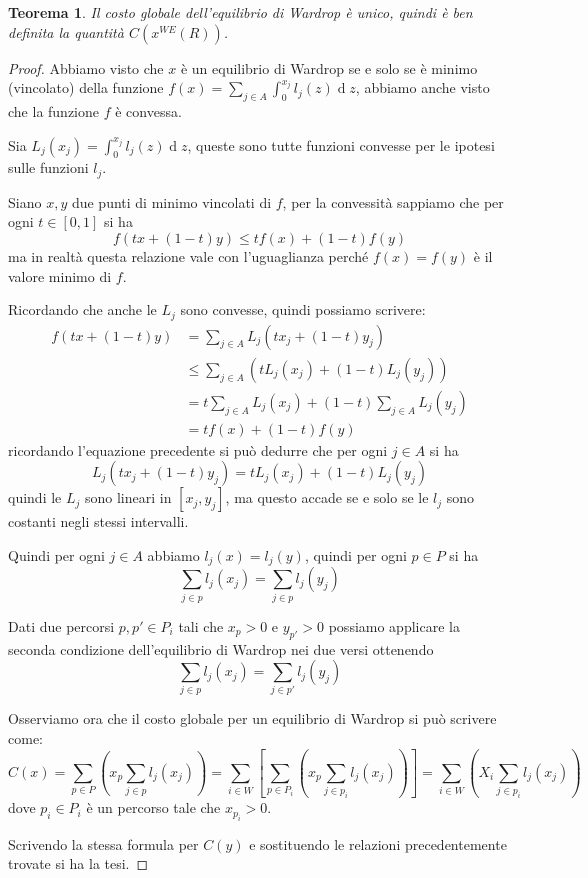 \documentclass[a4paper]{article}
\newcounter{counter1}
\theoremstyle{plain}
\newtheorem{myteo}[counter1]{Teorema}
\theoremstyle{definition}
\theoremstyle{remark}
\newcommand{\pa}[1]{\left(#1\right)}
\newcommand{\bra}[1]{\left[#1\right]}
\DeclareMathOperator{\de}{d}
\begin{document}
\begin{myteo}
  Il costo globale dell'equilibrio di Wardrop è unico, quindi è ben
  definita la quantità $C\pa{x^{WE}\pa{R}}$.
\end{myteo}
\begin{proof}
  Abbiamo visto che $x$ è un equilibrio di Wardrop se e solo se è
  minimo (vincolato) della funzione $f(x) = \sum _{j\in A} \int _0
  ^{x_j} l_j(z)\de z$, abbiamo anche visto che la funzione $f$ è
  convessa.

  Sia $L_j(x_j) = \int _0 ^{x_j} l_j(z)\de z$, queste sono tutte
  funzioni convesse per le ipotesi sulle funzioni $l_j$.

  Siano $x,y$ due punti di minimo vincolati di $f$, per la convessità
  sappiamo che per ogni $t\in\bra{0,1}$ si ha
  \[ f\pa{ tx + (1-t)y} \le tf(x) + (1-t)f(y) \]
  ma in realtà questa relazione vale con l'uguaglianza perché
  $f(x)=f(y)$ è il valore minimo di $f$.

  Ricordando che anche le $L_j$ sono convesse, quindi possiamo
  scrivere:
  \begin{align*}
    f\pa{ tx + (1-t)y} & = \sum _{j\in A} L_j\pa{tx_j + (1-t)y_j} \\
    & \le \sum _{j\in A} \pa{ tL_j(x_j) + (1-t)L_j(y_j)} \\
    & = t \sum _{j\in A} L_j(x_j) + (1-t)\sum _{j\in A} L_j(y_j) \\
    & = tf(x) + (1-t)f(y)
  \end{align*}
  ricordando l'equazione precedente si può dedurre che per ogni $j\in
  A$ si ha
  \[ L_j\pa{tx_j + (1-t)y_j} = tL_j(x_j) + (1-t)L_j(y_j) \]
  quindi le $L_j$ sono lineari in $\bra{x_j,y_j}$, ma questo accade se
  e solo se le $l_j$ sono costanti negli stessi intervalli.

  Quindi per ogni $j\in A$ abbiamo $l_j(x) = l_j(y)$, quindi per ogni
  $p\in P$ si ha
  \[ \sum _{j\in p} l_j\pa{x_j} = \sum _{j\in p} l_j\pa{y_j} \]
  
  Dati due percorsi $p,p'\in P_i$ tali che $x_p>0$ e $y_{p'}>0$ possiamo
  applicare la seconda condizione dell'equilibrio di Wardrop nei due
  versi ottenendo
  \[ \sum _{j\in p} l_j\pa{x_j} = \sum _{j\in p'} l_j\pa{y_j} \]
  
  Osserviamo ora che il costo globale per un equilibrio di Wardrop si
  può scrivere come:
  \[ C\pa{x} = \sum _{p\in P} \pa{ x_p \sum _{j\in p} l_j\pa{x_j}} =
    \sum _{i\in W} \bra{ \sum _{p\in P_i} \pa{ x_p \sum _{j\in p_i}
        l_j\pa{x_j}} } = \sum _{i\in W} \pa{ X_i \sum _{j\in p_i}
      l_j\pa{x_j}} \]
  dove $p_i\in P_i$ è un percorso tale che $x_{p_i} > 0$.

  Scrivendo la stessa formula per $C\pa{y}$ e sostituendo le relazioni
  precedentemente trovate si ha la tesi.
\end{proof}
\end{document}
